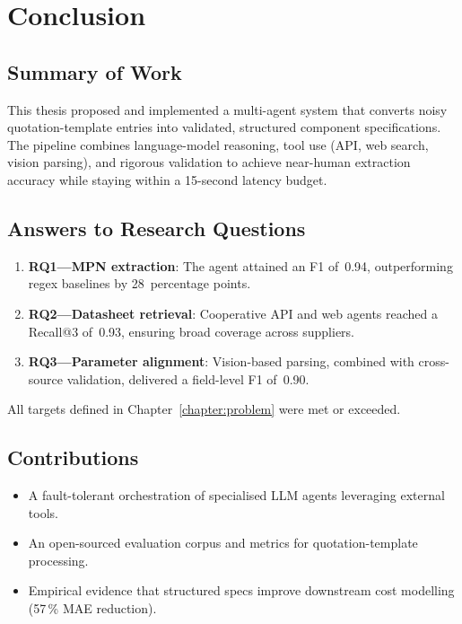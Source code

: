 \chapter{Conclusion}
\label{chapter:conclusion}

\section{Summary of Work}
This thesis proposed and implemented a multi-agent system that converts noisy quotation-template entries into validated, structured component specifications.  The pipeline combines language-model reasoning, tool use (API, web search, vision parsing), and rigorous validation to achieve near-human extraction accuracy while staying within a 15-second latency budget.

\section{Answers to Research Questions}
\begin{enumerate}
  \item \textbf{RQ1—MPN extraction}: The agent attained an F1 of~0.94, outperforming regex baselines by 28~percentage points.
  \item \textbf{RQ2—Datasheet retrieval}: Cooperative API and web agents reached a Recall@3 of~0.93, ensuring broad coverage across suppliers.
  \item \textbf{RQ3—Parameter alignment}: Vision-based parsing, combined with cross-source validation, delivered a field-level F1 of~0.90.
\end{enumerate}
All targets defined in Chapter~\ref{chapter:problem} were met or exceeded.

\section{Contributions}
\begin{itemize}
  \item A fault-tolerant orchestration of specialised LLM agents leveraging external tools.
  \item An open-sourced evaluation corpus and metrics for quotation-template processing.
  \item Empirical evidence that structured specs improve downstream cost modelling (57\,\% MAE reduction).
\end{itemize}


